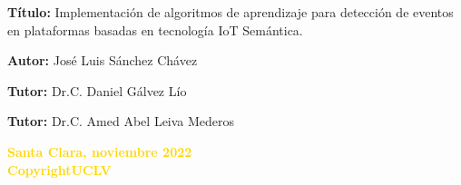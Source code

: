 \documentclass[12pt]{article}
\begin{document}
\begin{center}
    \Large{\textbf{T\'itulo:} Implementación de algoritmos de aprendizaje para detección de eventos en plataformas basadas en tecnología IoT Semántica.}
\end{center}

\vspace*{1cm}

\begin{center}
    \large{\textbf{Autor:} Jos\'e Luis S\'anchez Ch\'avez }
\end{center}

\begin{center}
    \large{\textbf{Tutor:} Dr.C. Daniel Gálvez L\'io}
\end{center}

\begin{center}
    \large{\textbf{Tutor:} Dr.C. Amed Abel Leiva Mederos}
\end{center}

\vspace*{0.3cm}

\begin{center}
    \textbf{\textcolor{gold}{Santa Clara, noviembre 2022 \\ Copyright\textcopyright UCLV}}
\end{center}


\clearpage






\newpage
\end{document}
